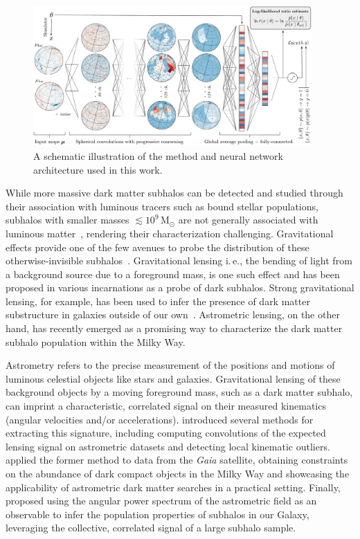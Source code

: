 \documentclass[twocolumn]{aastex631}
\newcommand{\ie}{{i.\,e.}\xspace}
\begin{document}
\begin{figure}[!htbp]
\centering
\includegraphics[width=0.95\textwidth]{summary.pdf}
\caption{A schematic illustration of the method and neural network architecture used in this work.}
\label{fig:model}
\end{figure}

While more massive dark matter subhalos can be detected and studied through their association with luminous tracers such as bound stellar populations, subhalos with smaller masses $\lesssim 10^9\,\mathrm M_\odot$ are not generally associated with luminous matter~\citep{Fitts:2016usl,2017MNRAS.467.2019R}, rendering their characterization challenging. Gravitational effects provide one of the few avenues to probe the distribution of these otherwise-invisible subhalos~\citep{Buckley:2017ijx}. Gravitational lensing \ie, the bending of light from a background source due to a foreground mass, is one such effect and has been proposed in various incarnations as a probe of dark subhalos. 
Strong gravitational lensing, for example, has been used to infer the presence of dark matter substructure in galaxies outside of our own~\citep{Hezaveh:2016ltk,Vegetti:2009cz,Gilman:2019nap,Vegetti:2012mc}.
Astrometric lensing, on the other hand, has recently emerged as a promising way to characterize the dark matter subhalo population within the Milky Way.

Astrometry refers to the precise measurement of the positions and motions of luminous celestial objects like stars and galaxies. Gravitational lensing of these background objects by a moving foreground mass, such as a dark matter subhalo, can imprint a characteristic, correlated signal on their measured kinematics (angular velocities and/or accelerations). \citet{VanTilburg:2018ykj} introduced several methods for extracting this signature, including computing convolutions of the expected lensing signal on astrometric datasets and detecting local kinematic outliers. \citet{Mondino:2020rkn} applied the former method to data from the \emph{Gaia} satellite, obtaining constraints on the abundance of dark compact objects in the Milky Way and showcasing the applicability of astrometric dark matter searches in a practical setting. Finally, \citet{Mishra-Sharma:2020ynk} proposed using the angular power spectrum of the astrometric field as an observable to infer the population properties of subhalos in our Galaxy, leveraging the collective, correlated signal of a large subhalo sample. 
\end{document}
